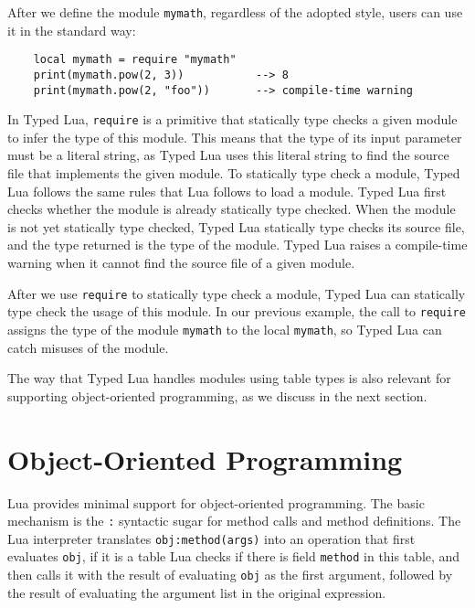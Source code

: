 
After we define the module \texttt{mymath}, regardless of the adopted style,
users can use it in the standard way:
\begin{verbatim}
    local mymath = require "mymath"
    print(mymath.pow(2, 3))           --> 8
    print(mymath.pow(2, "foo"))       --> compile-time warning
\end{verbatim}

In Typed Lua, \texttt{require} is a primitive that statically type checks
a given module to infer the type of this module.
This means that the type of its input parameter must be a literal string,
as Typed Lua uses this literal string to find the source file that
implements the given module.
To statically type check a module, Typed Lua follows the same rules
that Lua follows to load a module.
Typed Lua first checks whether the module is already statically type checked.
When the module is not yet statically type checked, Typed Lua
statically type checks its source file, and the type returned is the
type of the module.
Typed Lua raises a compile-time warning when it cannot find the source
file of a given module.

After we use \texttt{require} to statically type check a module,
Typed Lua can statically type check the usage of this module.
In our previous example, the call to \texttt{require} assigns the type
of the module \texttt{mymath} to the local \texttt{mymath},
so Typed Lua can catch misuses of the module.

The way that Typed Lua handles modules using table types is also
relevant for supporting object-oriented programming, as we discuss in
the next section.

\section{Object-Oriented Programming}
\label{sec:oop}

Lua provides minimal support for object-oriented programming.
The basic mechanism is the \texttt{:} syntactic sugar for method
calls and method definitions.
The Lua interpreter translates \texttt{obj:method(args)} into
an operation that first evaluates \texttt{obj}, if it is a table
Lua checks if there is field \texttt{method} in this table,
and then calls it with the result of evaluating \texttt{obj} as
the first argument, followed by the result of evaluating the
argument list in the original expression.

